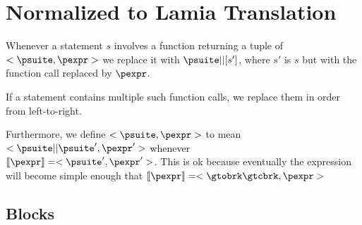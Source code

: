 \documentclass{article}
\begin{document}
\begin{grammar}
{  }
  \grule[heap]{\oheap}{
              \gtobrc \ovalvariable \mapsto \ovalue, \ldots \gtcbrc
      \cup    \gtobrc \omemvariable \mapsto \omem, \ldots \gtcbrc
      \cup    \gtobrc \omem \mapsto \ovalue, \ldots \gtcbrc
  }
\end{grammar}

\section{Normalized to Lamia Translation}

Whenever a statement $s$ involves a function returning a tuple of $<\psuite, \pexpr>$ we
replace it with $\psuite || [s']$, where $s'$ is $s$ but with the function call replaced by $\pexpr$.

If a statement contains multiple such function calls, we replace them in order from left-to-right.

Furthermore, we define $<\psuite, \pexpr>$ to mean $<\psuite || \psuite', \pexpr'>$ whenever\\
$\meaningof{\pexpr} = <\psuite', \pexpr'>$. This is ok because eventually the expression will become simple
enough that $\meaningof{\pexpr} = <\gtobrk \gtcbrk, \pexpr>$

\subsection{Blocks}

\begin{mathpar}
\end{mathpar}
\end{document}

